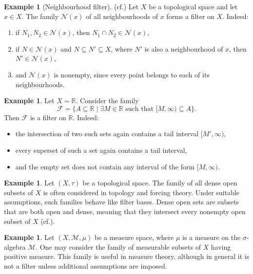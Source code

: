 \documentclass[10pt]{book}
\theoremstyle{definition}
\newtheorem{example}[theorem]{Example}
\begin{document}
\begin{example}[Neighbourhood filter] (cf.\cite{erne1980order,jager2008lattice})
Let \(X\) be a topological space and let \(x\in X\).  
The family \(\mathcal{N}(x)\) of all neighbourhoods of \(x\) forms a filter on \(X\). Indeed:
\begin{enumerate}
    \item if \(N_1,N_2\in\mathcal{N}(x)\), then \(N_1\cap N_2\in\mathcal{N}(x)\),
    \item if \(N\in\mathcal{N}(x)\) and \(N\subseteq N'\subseteq X\), where \(N'\) is also a neighbourhood of \(x\), then \(N'\in\mathcal{N}(x)\),
    \item and \(\mathcal{N}(x)\) is nonempty, since every point belongs to each of its neighbourhoods.
\end{enumerate}
\end{example}

\begin{example}
Let \(X=\mathbb{R}\).  
Consider the family
\[
\mathcal{F}=\{A\subseteq \mathbb{R}\mid \exists M\in\mathbb{R}\text{ such that }[M,\infty)\subseteq A\}.
\]
Then \(\mathcal{F}\) is a filter on \(\mathbb{R}\). Indeed:
\begin{itemize}
    \item the intersection of two such sets again contains a tail interval \([M',\infty)\),
    \item every superset of such a set again contains a tail interval,
    \item and the empty set does not contain any interval of the form \([M,\infty)\).
\end{itemize}
\end{example}

\begin{example}
Let \((X,\tau)\) be a topological space.  
The family of all dense open subsets of \(X\) is often considered in topology and forcing theory.  
Under suitable assumptions, such families behave like filter bases.  
Dense open sets are subsets that are both open and dense, meaning that they intersect every nonempty open subset of \(X\) (cf.\cite{moreno1998weak,grcic2022densehybrid}).
\end{example}

\begin{example}
Let \((X,\mathcal{M},\mu)\) be a measure space, where \(\mu\) is a measure on the \(\sigma\)-algebra \(\mathcal{M}\).  
One may consider the family of measurable subsets of \(X\) having positive measure.  
This family is useful in measure theory, although in general it is not a filter unless additional assumptions are imposed.
\end{example}
\end{document}
